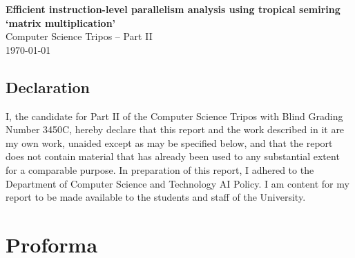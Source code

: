 \documentclass[12pt,a4paper,oneside]{report}
\theoremstyle{definition}
\begin{document}


\pagestyle{empty}


\vspace*{60mm}
\begin{center}
\Huge
\textbf{Efficient instruction-level parallelism analysis using tropical semiring `matrix multiplication'} \\[5mm]
Computer Science Tripos -- Part II \\[5mm]
\today  %
\end{center}

 
\newpage
\section*{Declaration}

I, the candidate for Part II of the Computer Science Tripos with Blind Grading Number 3450C, hereby declare that this
report and the work described in it are my own work, unaided except as may be specified below, and that the report does
not contain material that has already been used to any substantial extent for a comparable purpose. In preparation of
this report, I adhered to the Department of Computer Science and Technology AI Policy.
I am content for my report to be made available to the students and staff of the University.

\medskip
{}



\chapter*{Proforma}

\begingroup
\sloppy
\end{document}
